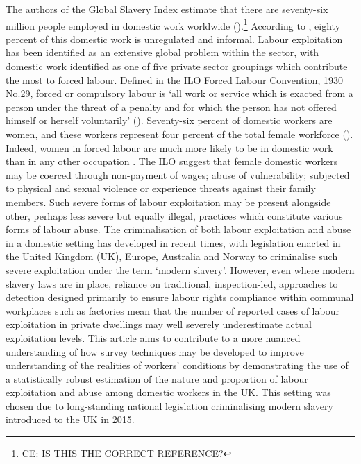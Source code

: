 \documentclass[
  12pt,
  letterpaper,
  DIV=11,
  numbers=noendperiod]{scrartcl}
\theoremstyle{plain}
\theoremstyle{definition}
\begin{document}
The authors of the Global Slavery Index estimate that there are
seventy-six million people employed in domestic work worldwide
(\textcite{international_labour_organization_global_2022}).\footnote{CE:
  IS THIS THE CORRECT REFERENCE?} According to
\textcite{bonnet_domestic_2022}, eighty percent of this domestic work is
unregulated and informal. Labour exploitation has been identified as an
extensive global problem within the sector, with domestic work
identified as one of five private sector groupings which contribute the
most to forced labour. Defined in the ILO Forced Labour Convention, 1930
No.29, forced or compulsory labour is `all work or service which is
exacted from a person under the threat of a penalty and for which the
person has not offered himself or herself voluntarily'
(\textcite{international_labour_organization_global_2022}). Seventy-six
percent of domestic workers are women, and these workers represent four
percent of the total female workforce
(\textcite{international_labour_organization_global_2022}). Indeed,
women in forced labour are much more likely to be in domestic work than
in any other occupation
\autocite{international_labour_organization_global_2022}. The ILO
suggest that female domestic workers may be coerced through non-payment
of wages; abuse of vulnerability; subjected to physical and sexual
violence or experience threats against their family members. Such severe
forms of labour exploitation may be present alongside other, perhaps
less severe but equally illegal, practices which constitute various
forms of labour abuse. The criminalisation of both labour exploitation
and abuse in a domestic setting has developed in recent times, with
legislation enacted in the United Kingdom (UK), Europe, Australia and
Norway to criminalise such severe exploitation under the term `modern
slavery'. However, even where modern slavery laws are in place, reliance
on traditional, inspection-led, approaches to detection designed
primarily to ensure labour rights compliance within communal workplaces
such as factories mean that the number of reported cases of labour
exploitation in private dwellings may well severely underestimate actual
exploitation levels. This article aims to contribute to a more nuanced
understanding of how survey techniques may be developed to improve
understanding of the realities of workers' conditions by demonstrating
the use of a statistically robust estimation of the nature and
proportion of labour exploitation and abuse among domestic workers in
the UK. This setting was chosen due to long-standing national
legislation criminalising modern slavery introduced to the UK in 2015.
\end{document}
